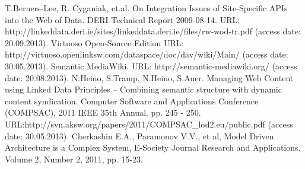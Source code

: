 \documentclass[utf8]{../IncArticle}
\begin{document}
\begin{thebibliography}{11}
 T.Berners-Lee, R. Cyganiak, et.al. On Integration Issues of Site-Specific APIs into the Web of Data. DERI Technical Report 2009-08-14. URL: http://linkeddata.deri.ie/sites/linkeddata.deri.ie/files/rw-wod-tr.pdf (access date: 20.09.2013).
 Virtuoso Open-Source Edition URL: http://virtuoso.openlinksw.com/dataspace/doc/dav/wiki/Main/ (access date: 30.05.2013).
 Semantic MediaWiki. URL: http://semantic-mediawiki.org/ (access date: 20.08.2013).
 N.Heino, S.Tramp, N.Heino, S.Auer. Managing Web
  Content using Linked Data Principles – Combining semantic structure
  with dynamic content syndication. Computer Software and Applications
  Conference (COMPSAC), 2011 IEEE 35th Annual. pp. 245 -
  250. URL:http://svn.aksw.org/papers/2011/COMPSAC\_lod2.eu/public.pdf
  (access date: 30.05.2013).
 Cherkashin E.A., Paramonov V.V., et al, Model Driven Architecture is a Complex System, E-Society Journal Research and Applications. Volume 2, Number 2, 2011, pp. 15-23.
\end{thebibliography}

\end{document}
